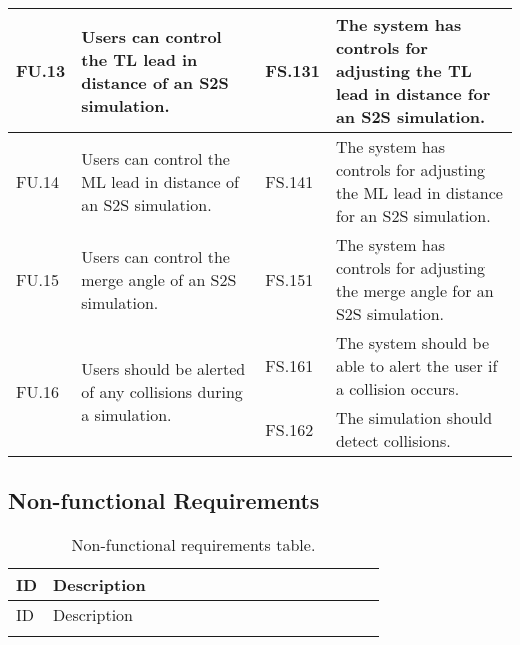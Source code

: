 \begin{appendices}
\begin{longtable}{|p{0.1\linewidth}|p{0.4\linewidth}|p{0.1\linewidth}|p{0.4\linewidth}|}
\hline
FU.13 & Users can control the TL lead in distance of an S2S simulation. & FS.131 & The system has controls for adjusting the TL lead in distance for an S2S simulation. \\ 
\hline
FU.14 & Users can control the ML lead in distance of an S2S simulation. & FS.141 & The system has controls for adjusting the ML lead in distance for an S2S simulation. \\ 
\hline
FU.15 & Users can control the merge angle of an S2S simulation. & FS.151 & The system has controls for adjusting the merge angle for an S2S simulation. \\ 
\hline
\multirow{2}{*}{FU.16} & \multirow{2}{*}{\parbox{\linewidth}{Users should be alerted of any collisions during a simulation.}}
 & FS.161 & The system should be able to alert the user if a collision occurs. \\
 &  & FS.162 & The simulation should detect collisions. \\ 
\end{longtable}

\subsection{Non-functional Requirements}
\label{subsec:Non-functional Requirements Appendix}
\begin{longtable}{|p{0.1\linewidth}|p{0.9\linewidth}|}
\caption{Non-functional requirements table.}\label{tab:nonFunctionalRequirementsAppendix}\\
\hline
ID & Description \\
\hline
\endfirsthead

\hline
ID & Description \\
\hline
\endhead

\hline
\endfoot

\hline
\endlastfoot


\end{longtable}
\end{appendices}
